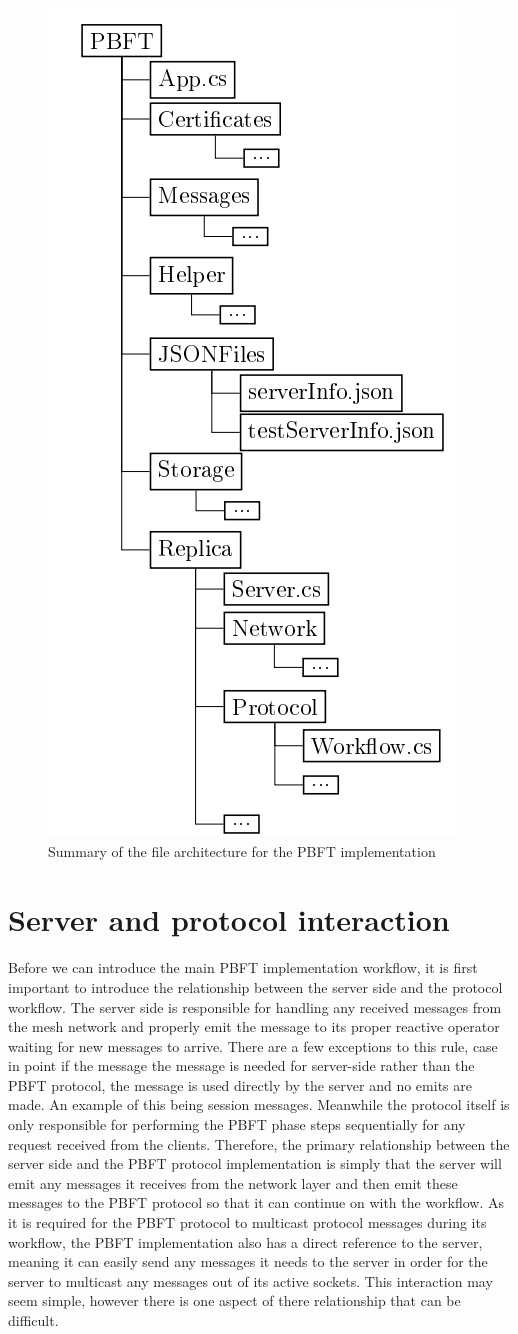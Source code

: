 \begin{figure}[H]
	\includegraphics[width=0.45\linewidth]{figures/filestructtest}
	\caption{Summary of the file architecture for the PBFT implementation}
    \label{fig:filestruct}
\end{figure}

\newpage

\section{Server and protocol interaction}
Before we can introduce the main PBFT implementation workflow, it is first important to introduce the relationship between the server side and the protocol workflow. The server side is responsible for handling any received messages from the mesh network and properly emit the message to its proper reactive operator waiting for new messages to arrive. There are a few exceptions to this rule, case in point if the message the message is needed for server-side rather than the PBFT protocol, the message is used directly by the server and no emits are made. An example of this being session messages. Meanwhile the protocol itself is only responsible for performing the PBFT phase steps sequentially for any request received from the clients. Therefore, the primary relationship between the server side and the PBFT protocol implementation is simply that the server will emit any messages it receives from the network layer and then emit these messages to the PBFT protocol so that it can continue on with the workflow. As it is required for the PBFT protocol to multicast protocol messages during its workflow, the PBFT implementation also has a direct reference to the server, meaning it can easily send any messages it needs to the server in order for the server to multicast any messages out of its active sockets. This interaction may seem simple, however there is one aspect of there relationship that can be difficult. 

